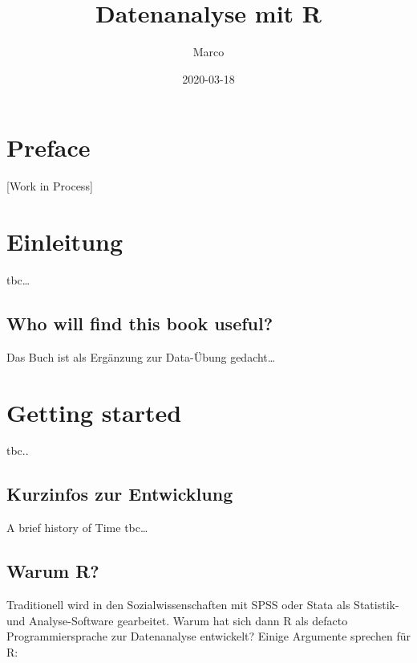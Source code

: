 \documentclass[
]{book}
\title{Datenanalyse mit R}
\author{Marco}
\date{2020-03-18}
\begin{document}
\maketitle

{
\setcounter{tocdepth}{1}
\tableofcontents
}
\hypertarget{preface}{%
\chapter*{Preface}\label{preface}}

{[}Work in Process{]}

\hypertarget{einleitung}{%
\chapter*{Einleitung}\label{einleitung}}

tbc\ldots{}

\hypertarget{who-will-find-this-book-useful}{%
\section*{Who will find this book useful?}\label{who-will-find-this-book-useful}}

Das Buch ist als Ergänzung zur Data-Übung gedacht\ldots{}

\hypertarget{getting-started}{%
\chapter{Getting started}\label{getting-started}}

tbc..

\hypertarget{kurzinfos-zur-entwicklung}{%
\section{Kurzinfos zur Entwicklung}\label{kurzinfos-zur-entwicklung}}

A brief history of Time tbc\ldots{}

\hypertarget{warum-r}{%
\section{Warum R?}\label{warum-r}}

Traditionell wird in den Sozialwissenschaften mit SPSS oder Stata als Statistik- und Analyse-Software gearbeitet. Warum hat sich dann R als defacto Programmiersprache zur Datenanalyse entwickelt? Einige Argumente sprechen für R:
\end{document}
